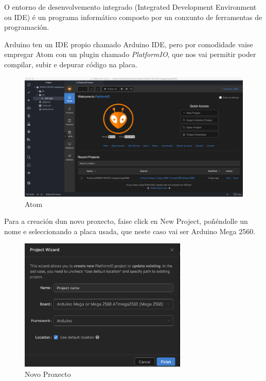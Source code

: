 \documentclass[11pt,twoside]{book}
\begin{document}
O entorno de desenvolvemento integrado (Integrated Development Environment ou IDE) é un programa informático composto por un conxunto de ferramentas de programación. 

Arduino ten un IDE propio chamado Arduino IDE, pero por comodidade vaise empregar Atom con un plugin chamado \textit{PlatformIO}, que nos vai permitir poder compilar, subir e depurar código na placa.

\begin{figure}[H]
	\begin{center}
		\includegraphics[width=15cm]{images/Atom.png}
	\end{center}
	\caption{Atom}
	\label{fig:Atom}
\end{figure}

Para a creación dun novo proxecto, faise click en New Project, poñéndolle un nome e seleccionando a placa usada, que neste caso vai ser Arduino Mega 2560.

\begin{figure}[H]
	\begin{center}
		\includegraphics[width=8cm]{images/NewProject.png}
	\end{center}
	\caption{Novo Proxecto}
	\label{fig:NewProject}
\end{figure}
\end{document}
